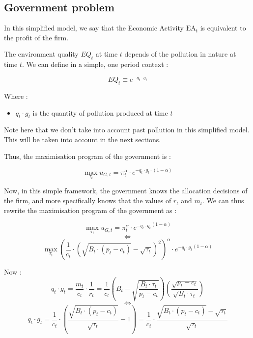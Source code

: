 \documentclass{article}
\begin{document}
\subsection{Government problem}

In this simplified model, we say that the Economic Activity $\text{EA}_{t}$ is equivalent to the profit of the firm.

The environment quality $EQ_{t}$ at time $t$ depends of the pollution in nature at time $t$. We can define in a simple, one period context : 

\begin{equation}
    EQ_{t}\equiv e^{-q_{t}\cdot g_{t}}
\end{equation}

Where :
\begin{itemize}
    \item $q_{t}\cdot g_{t}$ is the quantity of pollution produced at time $t$
\end{itemize}

Note here that we don't take into account past pollution in this simplified model. This will be taken into account in the next sections. 

Thus, the maximisation program of the government is : 

\begin{equation*}
    \max_{\tau_{t}}{u_{G,t}=\pi_{t}^{\alpha}\cdot e^{-q_{t}\cdot g_{t}\cdot(1-\alpha)}}
\end{equation*}

Now, in this simple framework, the government knows the allocation decisions of the firm, and more specifically knows that the values of $r_{t}$ and $m_{t}$. We can thus rewrite the maximisation program of the government as : 

$$
    \max_{\tau_{t}}{u_{G,t}=\pi_{t}^{\alpha}\cdot {e^{-q_{t}\cdot g_{t}}}^{(1-\alpha)}}
$$
$$\iff$$
$$\max_{\tau_{t}}{\left(\frac{1}{c_{t}}\cdot\left({\sqrt{B_{t}\cdot (p_{t}-c_{t})}-\sqrt{\tau_{t}}}\right)^{2}\right)^{\alpha}\cdot {e^{-q_{t}\cdot g_{t}}}^{(1-\alpha)}}$$

Now : 
$$q_{t}\cdot g_{t}=\frac{m_{t}}{c_{t}}\cdot\frac{1}{r_{t}}=\frac{1}{c_{t}}\left(B_{t}-\sqrt{\frac{B_{t}\cdot \tau_{t}}{p_{t}-c_{t}}}\right)\left(\frac{\sqrt{p_{t}-c_{t}}}{\sqrt{B_{t}\cdot \tau_{t}}}\right)$$
$$\iff$$
$$q_{t}\cdot g_{t}=\frac{1}{c_{t}}\cdot \left(\frac{\sqrt{B_{t}\cdot(p_{t}-c_{t})}}{\sqrt{\tau_{t}}}-1\right)=\frac{1}{c_{t}}\cdot \frac{\sqrt{B_{t}\cdot(p_{t}-c_{t})}-\sqrt{\tau_{t}}}{\sqrt{\tau_{t}}}$$
\end{document}

